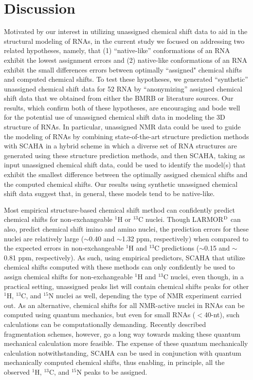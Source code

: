 \documentclass[journal=jcisd8,manuscript=article,layout=onecolumn]{achemso}
\begin{document}
\section{Discussion} 
Motivated by our interest in utilizing unassigned chemical shift data to aid in the structural modeling of RNAs, in the current study we focused on addressing two related hypotheses, namely, that (1) ``native-like” conformations of an RNA exhibit the lowest assignment errors and (2)  native-like conformations of an RNA exhibit the small differences errors between optimally ``assigned" chemical shifts and computed chemical shifts. To test these hypotheses, we generated ``synthetic'' unassigned chemical shift data for 52 RNA by ``anonymizing'' assigned chemical shift data that we obtained from either the BMRB or literature sources. Our results, which confirm both of these hypotheses, are encouraging and bode well for the potential use of unassigned chemical shift data in modeling the 3D structure of RNAs. In  particular, unassigned NMR data could be used to guide the modeling of RNAs by combining state-of-the-art structure prediction methods with SCAHA in a hybrid scheme in which a diverse set of RNA structures are generated using these structure prediction methods, and then SCAHA, taking as input unassigned chemical shift data, could be used to identify the model(s) that exhibit the smallest difference between the optimally assigned chemical shifts and the computed chemical shifts. Our results using synthetic unassigned chemical shift data suggest that, in general, these models tend to be native-like. 

Most empirical structure-based chemical shift method can confidently predict chemical shifts for non-exchangeable $^{1}$H or $^{13}$C nuclei\cite{dejaegere1999an, cromsigt2001prediction, frank2013prediction, frank2014simple}. Though LARMOR$^{\rm D}$ can also, predict chemical shift imino and amino nuclei, the prediction errors for these nuclei are relatively large ($\sim$0.40 and $\sim$1.32 ppm, respectively)\cite{frank2014simple} when compared to the expected errors in non-exchangeable $^{1}$H and $^{13}$C predictions ($\sim$0.15 and $\sim$0.81 ppm, respectively)\cite{frank2014simple}. As such, using empirical predictors, SCAHA that utilize chemical shifts computed with these methods can only confidently be used to assign chemical shifts for non-exchangeable $^{1}$H and $^{13}$C nuclei, even though, in a practical setting, unassigned peaks list will contain chemical shifts peaks for other $^{1}$H, $^{13}$C,  and $^{15}$N nuclei as well, depending the type of NMR experiment carried out. As an alternative, chemical shifts for all NMR-active nuclei in RNAs can be computed using quantum mechanics, but even for small RNAs ($<$40-nt), such calculations can be computationally demanding.  Recently described fragmentation schemes, however, go a long way towards making these quantum mechanical calculation more feasible\cite{swails2015afnmr}. The expense of these quantum mechanically calculation notwithstanding, SCAHA can be used in conjunction with quantum mechanically computed chemical shifts, thus enabling, in principle, all the observed  $^{1}$H, $^{13}$C,  and $^{15}$N peaks to be assigned.
\end{document}
